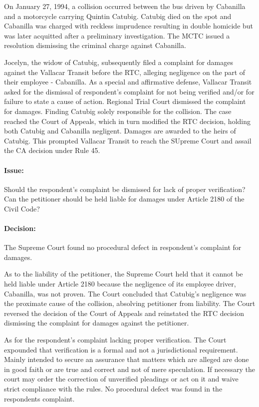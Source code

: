 \documentclass[
12pt,
oneside,
onehalfspacing,
headsepline
]{DigestCollection}
\begin{document}
On January 27, 1994, a collision occurred between the bus driven by Cabanilla and a motorcycle carrying Quintin Catubig. Catubig died on the spot and Cabanilla was charged with reckless imprudence resulting in double homicide but was later acquitted after a preliminary investigation. The MCTC issued a resolution dismissing the criminal charge against Cabanilla.

Jocelyn, the widow of Catubig, subsequently filed a complaint for damages against the Vallacar Transit before the RTC, alleging negligence on the part of their employee - Cabanilla. As a special and affirmative defense, Vallacar Transit asked for the dismissal of respondent’s complaint for not being verified and/or for failure to state a cause of action. Regional Trial Court dismissed the complaint for damages. Finding Catubig solely responsible for the collision. The case reached the Court of Appeals, which in turn modified the RTC decision, holding both Catubig and Cabanilla negligent. Damages are awarded to the heirs of Catubig. This prompted Vallacar Transit to reach the SUpreme Court and assail the CA decision under Rule 45.

\paragraph{Issue:}

Should the respondent's complaint be dismissed for lack of proper verification? Can the petitioner should be held liable for damages under Article 2180 of the Civil Code?

\paragraph{Decision:}

The Supreme Court found no procedural defect in respondent's complaint for damages.

As to the liability of the petitioner, the Supreme Court held that it cannot be held liable under Article 2180 because the negligence of its employee driver, Cabanilla, was not proven. The Court concluded that Catubig's negligence was the proximate cause of the collision, absolving petitioner from liability. The Court reversed the decision of the Court of Appeals and reinstated the RTC decision dismissing the complaint for damages against the petitioner.

As for the respondent's complaint lacking proper verification. The Court expounded that verification is a formal and not a jurisdictional requirement. Mainly intended to secure an assurance that matters which are alleged are done in good faith or are true and correct and not of mere speculation. If necessary the court may order the correction of unverified pleadings or act on it and waive strict compliance with the rules. No procedural defect was found in the respondents complaint.
\end{document}

